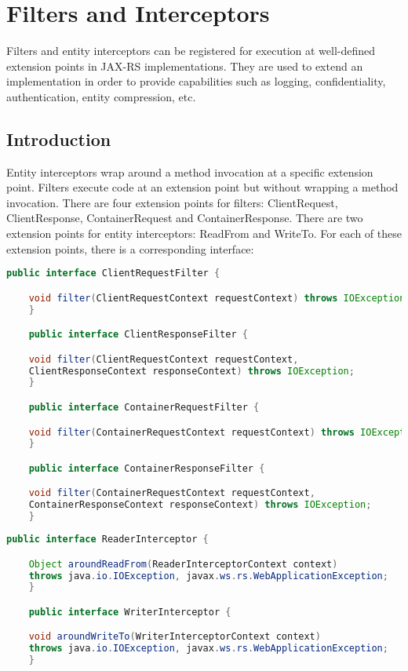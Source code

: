 \chapter{Filters and Interceptors}
\label{filters_and_interceptors}

Filters and entity interceptors can be registered for execution at well-defined extension points in JAX-RS
implementations. \textcolor{highlight green}{They are used to extend an implementation in order to provide capabilities
such as logging, confidentiality, authentication, entity compression, etc.}

\section{Introduction}
\label{introduction_filters}

Entity interceptors wrap around a method invocation at a specific extension point. Filters execute code at an extension
point but without wrapping a method invocation. There are four extension points for filters: ClientRequest,
ClientResponse, ContainerRequest and ContainerResponse. There are two extension points for entity interceptors:
ReadFrom and WriteTo. For each of these extension points, there is a corresponding interface:

\begin{lstlisting}[language=Java]
    public interface ClientRequestFilter {

    void filter(ClientRequestContext requestContext) throws IOException;
    }

    public interface ClientResponseFilter {

    void filter(ClientRequestContext requestContext,
    ClientResponseContext responseContext) throws IOException;
    }

    public interface ContainerRequestFilter {

    void filter(ContainerRequestContext requestContext) throws IOException;
    }

    public interface ContainerResponseFilter {

    void filter(ContainerRequestContext requestContext,
    ContainerResponseContext responseContext) throws IOException;
    }
\end{lstlisting}

\begin{lstlisting}[language=Java]
    public interface ReaderInterceptor {

    Object aroundReadFrom(ReaderInterceptorContext context)
    throws java.io.IOException, javax.ws.rs.WebApplicationException;
    }

    public interface WriterInterceptor {

    void aroundWriteTo(WriterInterceptorContext context)
    throws java.io.IOException, javax.ws.rs.WebApplicationException;
    }
\end{lstlisting}

